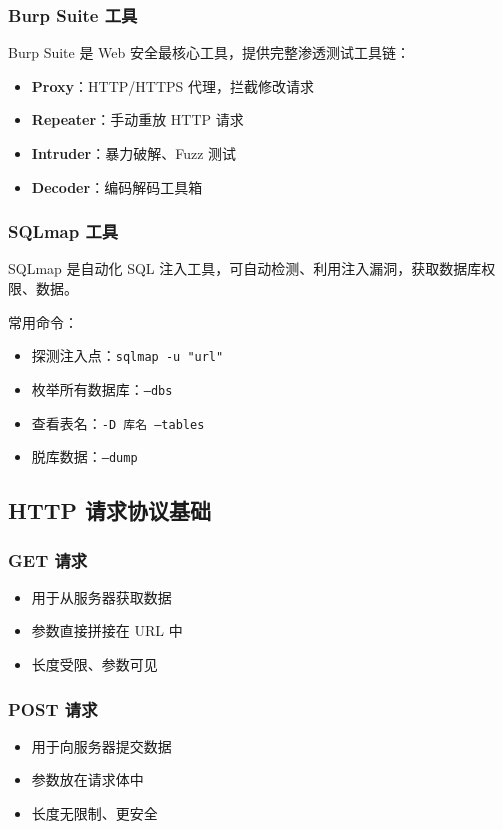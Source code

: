 \subsubsection{Burp Suite 工具}
Burp Suite 是 Web 安全最核心工具，提供完整渗透测试工具链：
\begin{itemize}[leftmargin=*]
    \item \textbf{Proxy}：HTTP/HTTPS 代理，拦截修改请求
    \item \textbf{Repeater}：手动重放 HTTP 请求
    \item \textbf{Intruder}：暴力破解、Fuzz 测试
    \item \textbf{Decoder}：编码解码工具箱
\end{itemize}

\subsubsection{SQLmap 工具}
SQLmap 是自动化 SQL 注入工具，可自动检测、利用注入漏洞，获取数据库权限、数据。

常用命令：
\begin{itemize}[leftmargin=*]
    \item 探测注入点：\texttt{sqlmap -u "url"}
    \item 枚举所有数据库：\texttt{--dbs}
    \item 查看表名：\texttt{-D 库名 --tables}
    \item 脱库数据：\texttt{--dump}
\end{itemize}

\newpage
\subsection{HTTP 请求协议基础}

\subsubsection{GET 请求}
\begin{itemize}[leftmargin=*]
    \item 用于从服务器获取数据
    \item 参数直接拼接在 URL 中
    \item 长度受限、参数可见
\end{itemize}

\subsubsection{POST 请求}
\begin{itemize}[leftmargin=*]
    \item 用于向服务器提交数据
    \item 参数放在请求体中
    \item 长度无限制、更安全
\end{itemize}

